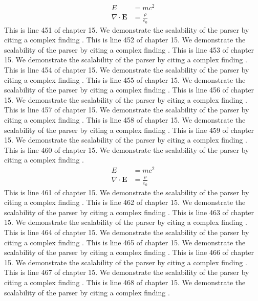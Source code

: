 \begin{align*}
  E &= mc^2 \\
  \nabla \cdot \mathbf{E} &= \frac{\rho}{\varepsilon_0}
\end{align*}
This is line 451 of chapter 15. We demonstrate the scalability of the parser by citing a complex finding \cite{ref15_451}.
This is line 452 of chapter 15. We demonstrate the scalability of the parser by citing a complex finding \cite{ref15_452}.
This is line 453 of chapter 15. We demonstrate the scalability of the parser by citing a complex finding \cite{ref15_453}.
This is line 454 of chapter 15. We demonstrate the scalability of the parser by citing a complex finding \cite{ref15_454}.
This is line 455 of chapter 15. We demonstrate the scalability of the parser by citing a complex finding \cite{ref15_455}.
This is line 456 of chapter 15. We demonstrate the scalability of the parser by citing a complex finding \cite{ref15_456}.
This is line 457 of chapter 15. We demonstrate the scalability of the parser by citing a complex finding \cite{ref15_457}.
This is line 458 of chapter 15. We demonstrate the scalability of the parser by citing a complex finding \cite{ref15_458}.
This is line 459 of chapter 15. We demonstrate the scalability of the parser by citing a complex finding \cite{ref15_459}.
This is line 460 of chapter 15. We demonstrate the scalability of the parser by citing a complex finding \cite{ref15_460}.
\begin{align*}
  E &= mc^2 \\
  \nabla \cdot \mathbf{E} &= \frac{\rho}{\varepsilon_0}
\end{align*}
This is line 461 of chapter 15. We demonstrate the scalability of the parser by citing a complex finding \cite{ref15_461}.
This is line 462 of chapter 15. We demonstrate the scalability of the parser by citing a complex finding \cite{ref15_462}.
This is line 463 of chapter 15. We demonstrate the scalability of the parser by citing a complex finding \cite{ref15_463}.
This is line 464 of chapter 15. We demonstrate the scalability of the parser by citing a complex finding \cite{ref15_464}.
This is line 465 of chapter 15. We demonstrate the scalability of the parser by citing a complex finding \cite{ref15_465}.
This is line 466 of chapter 15. We demonstrate the scalability of the parser by citing a complex finding \cite{ref15_466}.
This is line 467 of chapter 15. We demonstrate the scalability of the parser by citing a complex finding \cite{ref15_467}.
This is line 468 of chapter 15. We demonstrate the scalability of the parser by citing a complex finding \cite{ref15_468}.
